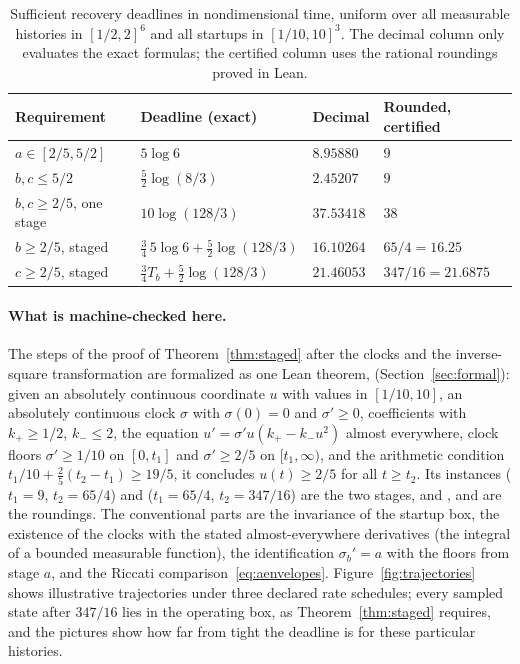 \documentclass[11pt]{article}
\theoremstyle{definition}
\theoremstyle{remark}
\begin{document}
\begin{table}[ht]
\centering
\begin{tabular}{llll}
\toprule
Requirement & Deadline (exact) & Decimal & Rounded, certified\\
\midrule
$a\in[2/5,5/2]$ & $5\log6$ & $8.95880$ & $9$\\
$b,c\le5/2$ & $\tfrac52\log(8/3)$ & $2.45207$ & $9$\\
$b,c\ge2/5$, one stage & $10\log(128/3)$ & $37.53418$ & $38$\\
$b\ge2/5$, staged & $\tfrac34\,5\log6+\tfrac52\log(128/3)$ & $16.10264$ & $65/4=16.25$\\
$c\ge2/5$, staged & $\tfrac34T_b+\tfrac52\log(128/3)$ & $21.46053$ & $347/16=21.6875$\\
\bottomrule
\end{tabular}
\caption{Sufficient recovery deadlines in nondimensional time, uniform over all
measurable histories in $[1/2,2]^6$ and all startups in $[1/10,10]^3$. The decimal
column only evaluates the exact formulas; the certified column uses the rational
roundings proved in Lean.}
\label{tab:times}
\end{table}

\paragraph{What is machine-checked here.}
The steps of the proof of Theorem~\ref{thm:staged} after the clocks and the
inverse-square transformation are formalized as one Lean theorem,
 (Section~\ref{sec:formal}): given an absolutely
continuous coordinate $u$ with values in $[1/10,10]$, an absolutely continuous
clock $\sigma$ with $\sigma(0)=0$ and $\sigma'\ge0$, coefficients with
$k_+\ge1/2$, $k_-\le2$, the equation $u'=\sigma'u(k_+-k_-u^2)$ almost everywhere,
clock floors $\sigma'\ge1/10$ on $[0,t_1]$ and $\sigma'\ge2/5$ on $[t_1,\infty)$,
and the arithmetic condition $t_1/10+\frac25(t_2-t_1)\ge19/5$, it concludes
$u(t)\ge2/5$ for all $t\ge t_2$. Its instances 
($t_1=9$, $t_2=65/4$) and  ($t_1=65/4$, $t_2=347/16$)
are the two stages, and ,
 and  are the roundings.
The conventional parts are the invariance of the startup box, the existence of the
clocks with the stated almost-everywhere derivatives (the integral of a bounded
measurable function), the identification $\sigma_b'=a$ with the floors from stage
$a$, and the Riccati comparison~\eqref{eq:aenvelopes}.
Figure~\ref{fig:trajectories} shows illustrative trajectories under three declared
rate schedules; every sampled state after $347/16$ lies in the operating box, as
Theorem~\ref{thm:staged} requires, and the pictures show how far from tight the
deadline is for these particular histories.
\end{document}
